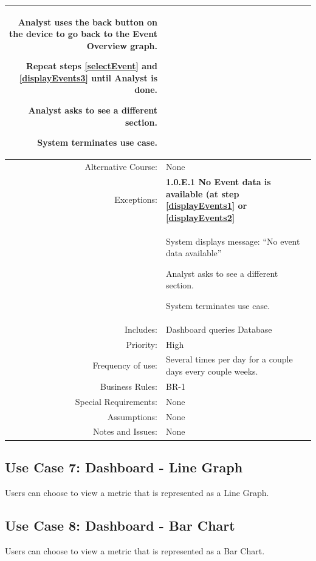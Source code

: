 \documentclass[12pt,oneside,letterpaper]{article}
\newenvironment{packed_enumerate}{ %
\vspace{-7mm}
\begin{enumerate}
  \setlength{\itemsep}{0pt}
  \setlength{\parskip}{0pt}
  \setlength{\parsep}{0pt}
}{\end{enumerate}
\vspace{-8mm}}
\begin{document}
\begin{longtable}{|r|p{3.8in}|}
\begin{packed_enumerate}
\item \label{displayEvents3}Analyst uses the back button on the device to go back to the Event Overview graph.
\item \label{repeat}Repeat steps \ref{selectEvent} and 
\ref{displayEvents3} until Analyst is done.
\item Analyst asks to see a different section.
\item System terminates use case.
\end{packed_enumerate}\\
\hline
Alternative Course:&None\\
\hline
Exceptions:&\textbf{1.0.E.1 No Event data is available (at step 
\ref{displayEvents1} or \ref{displayEvents2}}\\
&
\begin{packed_enumerate}
\item System displays message: ``No event data available''
\item Analyst asks to see a different section.
\item System terminates use case.
\end{packed_enumerate}\\
\hline
Includes:&Dashboard queries Database\\
\hline
Priority:&High\\
\hline
Frequency of use:&Several times per day for a couple days every couple 
weeks.\\
\hline
Business Rules:&BR-1\\
\hline
Special Requirements:&None\\
\hline
Assumptions:&None\\
\hline
Notes and Issues:&None\\
\hline
\end{longtable}

\subsection{\label{DashboardLineGraph}Use Case 7: Dashboard - Line 
Graph}
Users can choose to view a metric that is represented as 
a Line Graph.\\

\subsection{\label{DashboardBarChart}Use Case 8: Dashboard - Bar 
Chart}
Users can choose to view a metric that is represented as 
a Bar Chart.\\
\end{document}
